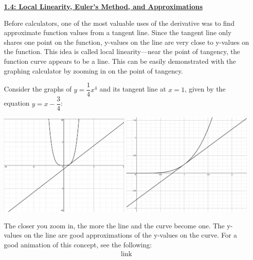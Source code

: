 \textbf{\underline{\large{1.4: Local Linearity, Euler's Method, and Approximations}}} \par

Before calculators, one of the most valuable uses of the derivative was to find approximate function values from a tangent line. Since the tangent line only shares one point on the function, y-values on the line are very close to y-values on the function. This idea is called local linearity—near the point of tangency, the function curve appears to be a line. This can be easily demonstrated with the graphing calculator by zooming in on the point of tangency. \par 

Consider the graphs of $y = \dfrac{1}{4}x^4$ and its tangent line at $x = 1$, given by the equation $y = x - \dfrac{3}{4}$: \par

\begin{center}
    \includegraphics[width=0.49\textwidth]{Support/Chapter 1 Graphics/1.4-Graphic1.png}
    \hfill
    \includegraphics[width=0.49\textwidth]{Support/Chapter 1 Graphics/1.4-Graphic2.png}
\end{center}

The closer you zoom in, the more the line and the curve become one. The y-values on the line are good approximations of the y-values on the curve. For a good animation of this concept, see the following: \begin{align*}
    \text{link}
\end{align*} 


